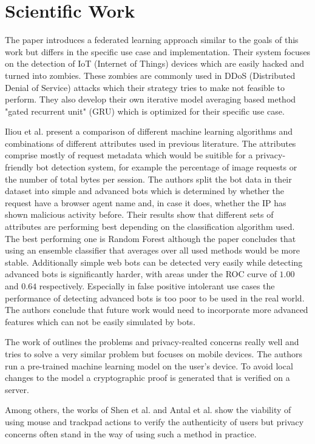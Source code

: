\documentclass[
    fontsize=12pt,
    headings=small,
    parskip=half,           %
    bibliography=totoc,
    numbers=noenddot,       %
    open=any,               %
    final                   %
    ]{scrreprt}
\begin{document}
\section{Scientific Work}

The paper \cite{LiJi2021} introduces a federated learning approach similar to the goals of this work but differs in the specific use case and implementation. Their system focuses on the detection of IoT (Internet of Things) devices which are easily hacked and turned into zombies. These zombies are commonly used in DDoS (Distributed Denial of Service) attacks which their strategy tries to make not feasible to perform. They also develop their own iterative model averaging based method "gated recurrent unit" (GRU) which is optimized for their specific use case.

Iliou et al. \cite{10.1145/3339252.3339267} present a comparison of different machine learning algorithms and combinations of different attributes used in previous literature. The attributes comprise mostly of request metadata which would be suitible for a privacy-friendly bot detection system, for example the percentage of image requests or the number of total bytes per session. The authors split the bot data in their dataset into simple and advanced bots which is determined by whether the request have a browser agent name and, in case it does, whether the IP has shown malicious activity before. Their results show that different sets of attributes are performing best depending on the classification algorithm used. The best performing one is Random Forest although the paper concludes that using an ensemble classifier that averages over all used methods would be more stable. Additionally simple web bots can be detected very easily while detecting advanced bots is significantly harder, with areas under the ROC curve of $1.00$ and $0.64$ respectively. Especially in false positive intolerant use cases the performance of detecting advanced bots is too poor to be used in the real world. The authors conclude that future work would need to incorporate more advanced features which can not be easily simulated by bots.

The work of \cite{PETS2021} outlines the problems and privacy-realted concerns really well and tries to solve a very similar problem but focuses on mobile devices. The authors run a pre-trained machine learning model on the user's device. To avoid local changes to the model a cryptographic proof is generated that is verified on a server.

Among others, the works of Shen et al. \cite{6263955} and Antal et al. \cite{9111596} \cite{DBLP:journals/corr/abs-1810-04668} show the viability of using mouse and trackpad actions to verify the authenticity of users but privacy concerns often stand in the way of using such a method in practice.
\end{document}

